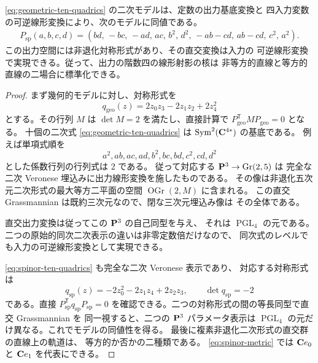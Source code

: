 \begin{lemma}[直交作用による標準化]
\label{lem:spinor-orthogonal-normalization}
\eqref{eq:geometric-ten-quadrics} の二次モデルは、定数の出力基底変換と
四入力変数の可逆線形変換により、次のモデルに同値である。
\begin{equation}
 \begin{split}
 P_{\mathrm{sp}}(a,b,c,d)=
 (bd,\,-bc,\,-ad,\,ac,\,b^2,\,d^2,\,-ab-cd,\,ab-cd,\,c^2,\,a^2).
 \end{split}
 \label{eq:spinor-ten-quadrics}
\end{equation}
この出力空間には非退化対称形式があり、その直交変換は入力の
可逆線形変換で実現できる。従って、出力の階数四の線形射影の核は
非等方的直線と等方的直線の二場合に標準化できる。
\end{lemma}

\begin{proof}
まず幾何的モデルに対し、対称形式を
\[
 q_{\mathrm{geo}}(z)=2z_0z_3-2z_1z_2+2z_4^2
\]
とする。その行列 $M$ は $\det M=2$ を満たし、直接計算で
$P_{\mathrm{geo}}^{\mathsf T}M P_{\mathrm{geo}}=0$ となる。
十個の二次式 \eqref{eq:geometric-ten-quadrics} は
$\operatorname{Sym}^2(\mathbf C^{4*})$ の基底である。
例えば単項式順を
\[
 a^2,ab,ac,ad,b^2,bc,bd,c^2,cd,d^2
\]
とした係数行列の行列式は $2$ である。
従って対応する $\mathbf P^3\to\operatorname{Gr}(2,5)$ は
完全な二次 Veronese 埋込みに出力線形変換を施したものである。
その像は非退化五次元二次形式の最大等方二平面の空間
$\operatorname{OGr}(2,M)$ に含まれる。
この直交 Grassmannian は既約三次元なので、閉な三次元埋込み像は
その全体である。

直交出力変換は従ってこの $\mathbf P^3$ の自己同型を与え、
それは $\operatorname{PGL}_4$ の元である。
二つの原始的同次二次表示の違いは非零定数倍だけなので、
同次式のレベルでも入力の可逆線形変換として実現できる。

\eqref{eq:spinor-ten-quadrics} も完全な二次 Veronese 表示であり、
対応する対称形式は
\begin{equation}
 q_{\mathrm{sp}}(z)=-2z_0^2-2z_1z_4+2z_2z_3,
 \qquad \det q_{\mathrm{sp}}=-2
 \label{eq:spinor-metric}
\end{equation}
である。直接 $P_{\mathrm{sp}}^{\mathsf T}q_{\mathrm{sp}}P_{\mathrm{sp}}=0$
を確認できる。二つの対称形式の間の等長同型で直交 Grassmannian を
同一視すると、二つの $\mathbf P^3$ パラメータ表示は $\operatorname{PGL}_4$
の元だけ異なる。これでモデルの同値性を得る。
最後に複素非退化二次形式の直交群の直線上の軌道は、
等方的か否かの二種類である。
\eqref{eq:spinor-metric} では $\mathbf C e_0$ と $\mathbf C e_1$ を代表にできる。
\end{proof}

